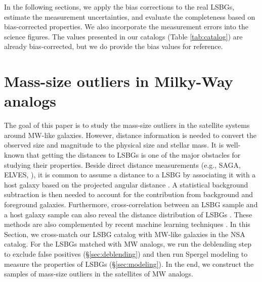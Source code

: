 \documentclass[twocolumn,astrosymb,twocolappendix]{aastex631}
\begin{document}
\begin{CJK*}{UTF8}{gbsn}
In the following sections, we apply the bias corrections to the real LSBGs, estimate the measurement uncertainties, and evaluate the completeness based on bias-corrected properties. We also incorporate the measurement errors into the science figures. The values presented in our catalogs (Table \ref{tab:catalog}) are already bias-corrected, but we do provide the bias values for reference. 



\section{Mass-size outliers in Milky-Way analogs}\label{sec:sample_construction}
The goal of this paper is to study the mass-size outliers in the satellite systems around MW-like galaxies. However, distance information is needed to convert the observed size and magnitude to the physical size and stellar mass. It is well-known that getting the distances to LSBGs is one of the major obstacles for studying their properties. Beside direct distance measurements (e.g., SAGA, ELVES, \citealt{Kadowaki2021}), it is common to assume a distance to a LSBG by associating it with a host galaxy based on the projected angular distance \citep[e.g.,][]{vanDokkum2015,vdBurg2016,Wang2021,Zaritsky2022,Nashimoto2022}. A statistical background subtraction is then needed to account for the contribution from background and foreground galaxies. Furthermore, cross-correlation between an LSBG sample and a host galaxy sample can also reveal the distance distribution of LSBGs \citep{Greene2022}. These methods are also complemented by recent machine learning techniques \citep{Baxter2021,xSAGA-I}. In this Section, we cross-match our LSBG catalog with MW-like galaxies in the NSA catalog. For the LSBGs matched with MW analogs, we run the deblending step to exclude false positives (\S\ref{sec:deblending}) and then run Spergel modeling to measure the properties of LSBGs (\S\ref{sec:modeling}). In the end, we construct the samples of mass-size outliers in the satellites of MW analogs. 


\end{CJK*}
\end{document}
